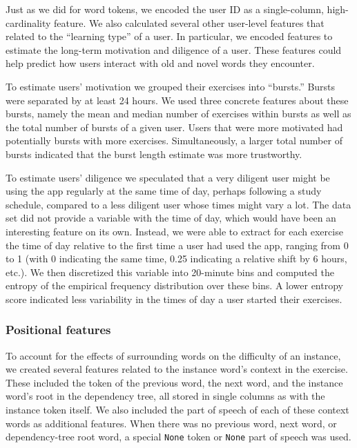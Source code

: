 \documentclass[11pt,a4paper]{article}
\begin{document}
Just as we did for word tokens, we encoded the user ID as a single-column,
high-cardinality feature. We also calculated several other user-level features that related to the ``learning type'' of a user. In particular, we encoded features to estimate the long-term motivation and diligence of a user. These features could help predict how users interact with old and novel words they encounter.

To estimate users' motivation we grouped their exercises into ``bursts.'' Bursts were separated by at least 24 hours.  We used three concrete features about these bursts, namely the mean and median number of exercises within bursts as well as the total number of bursts of a given user. Users that were more motivated had potentially bursts with more exercises. Simultaneously, a larger total number of bursts indicated that the burst length estimate was more trustworthy.


To estimate users' diligence we speculated that a very diligent user might be using the app regularly at the same time of day, perhaps following a study schedule, compared to a less diligent user whose times might vary a lot. The data set did not provide a variable with the time of day, which would have been an interesting feature on its own. Instead, we were able to extract for each exercise the time of day relative to the first time a user had used the app, ranging from 0 to 1 (with 0 indicating the same time, 0.25 indicating a relative shift by 6 hours, etc.).  We then discretized this variable into 20-minute bins and computed the entropy of the empirical frequency distribution over these bins. A lower entropy score indicated less variability in the times of day a user started their exercises.

\subsubsection{Positional features}

To account for the effects of surrounding words on the difficulty of an
instance, we created several features related to the instance word's context in
the exercise. These included the token of the previous word, the next word, and
the instance word's root in the dependency tree, all stored in single columns as with
the instance token itself. We also included the part of speech of each of these
context words as additional features. When there was no previous word, next word, or dependency-tree
root word, a special {\tt None} token or {\tt None} part of speech was used.
\end{document}
